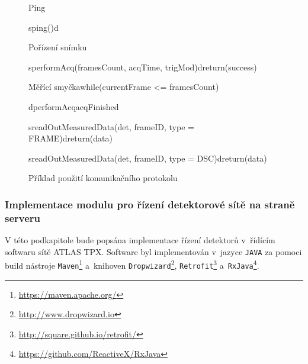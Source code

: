\begin{figure}[t]
	\begin{center}
		\begin{sequencediagram}
			\begin{sdblock}{Ping}{}
				\begin{call}{s}{ping()}{d}{}
				\end{call}
			\end{sdblock}
			\begin{sdblock}{Pořízení snímku}{}
				\begin{call}{s}{performAcq(framesCount, acqTime, trigMod)}{d}{return(success)}	
				\end{call}
				\begin{sdblock}{Měřící smyčka}{while(currentFrame <= framesCount)}
					\begin{callself}{d}{performAcq}{acqFinished}
					\end{callself}
					\begin{call}{s}{readOutMeasuredData(det, frameID, type = FRAME)}{d}{return(data)}
					\end{call}
					\begin{call}{s}{readOutMeasuredData(det, frameID, type = DSC)}{d}{return(data)}
					\end{call}
				\end{sdblock}
			\end{sdblock}
		\end{sequencediagram}
		\caption{Příklad použití komunikačního protokolu}
		\label{fig:uml:com_priklad}
	\end{center}
\end{figure}


\newpage

\subsubsection{Implementace modulu pro řízení detektorové sítě na straně serveru}\label{atlas:cont:impl}
V této podkapitole bude popsána implementace řízení detektorů v~řídícím softwaru sítě ATLAS TPX. Software byl implementován v~jazyce \texttt{JAVA} za pomoci build nástroje \texttt{Maven}\footnote{\url{https://maven.apache.org/}} a~knihoven \texttt{Dropwizard}\footnote{\url{http://www.dropwizard.io}}, \texttt{Retrofit}\footnote{\url{http://square.github.io/retrofit/}} a~\texttt{RxJava}\footnote{\url{https://github.com/ReactiveX/RxJava}}.

